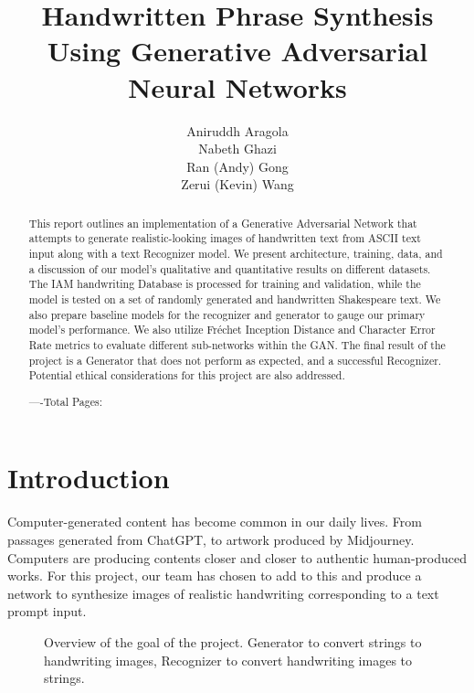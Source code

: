 \documentclass{article} %
\title{\centering Handwritten Phrase Synthesis Using Generative Adversarial Neural Networks}
\author{
Aniruddh Aragola  \\
\And
Nabeth Ghazi  \\
\And
Ran (Andy) Gong  \\
\And
Zerui (Kevin) Wang \\
}
\begin{document}
\maketitle

\begin{abstract}
    This report outlines an implementation of a Generative Adversarial Network that attempts to generate realistic-looking images of handwritten text from ASCII text input along with a text Recognizer model. We present architecture, training, data, and a discussion of our model's qualitative and quantitative results on different datasets. The IAM handwriting Database is processed for training and validation, while the model is tested on a set of randomly generated and handwritten Shakespeare text. We also prepare baseline models for the recognizer and generator to gauge our primary model's performance. We also utilize Fréchet Inception Distance and Character Error Rate metrics to evaluate different sub-networks within the GAN. The final result of the project is a Generator that does not perform as expected, and a successful Recognizer. Potential ethical considerations for this project are also addressed.

    ----Total Pages: \pageref{last_page}
\end{abstract}

\section{Introduction}
Computer-generated content has become common in our daily lives. From passages generated from ChatGPT, to artwork produced by Midjourney. Computers are producing contents closer and closer to authentic human-produced works. For this project, our team has chosen to add to this and produce a network to synthesize images of realistic handwriting corresponding to a text prompt input.

\begin{figure}[!hbpt]
    \begin{center}
        
    \end{center}
    \caption{Overview of the goal of the project. Generator to convert strings to handwriting images, Recognizer to convert handwriting images to strings.}
    \label{fig:generator_recognizer_purpose_intro}
\end{figure}
\end{document}
